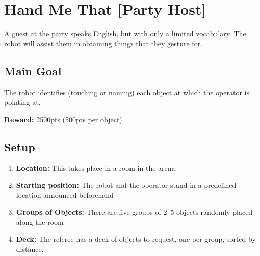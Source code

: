 \section{Hand Me That [Party Host]}
\label{test:hand-me-that}
A guest at the party speaks English, but with only a limited vocabulary. The robot will assist them in obtaining things that they gesture for.


\subsection*{Main Goal}
The robot identifies (touching or naming) each object at which the operator is pointing at.

\noindent\textbf{Reward:} 2500pts (500pts per object)


%
%
\subsection*{Setup}
\begin{enumerate}[nosep]
	\item \textbf{Location:} This takes place in a room in the arena.

	\item \textbf{Starting position:} The robot and the operator stand in a predefined location announced beforehand %

	\item \textbf{Groups of Objects:} There are five groups of 2--5 objects randomly placed along the room

	\item \textbf{Deck:} The referee has a deck of objects to request, one per group, sorted by distance.

\end{enumerate}


%
%
